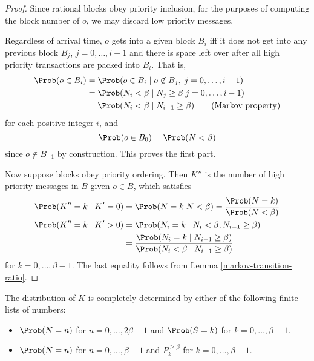 \documentclass[a4paper,11pt]{article}
\begin{document}
\begin{proof}

  Since rational blocks obey priority inclusion, for the purposes of computing the block number of $o$, we may discard low priority messages.
  
  Regardless of arrival time, $o$ gets into a given block $B_i$ iff it does not get into any previous block $B_j$, $j=0,\ldots,i-1$ and there is space left over after all high priority transactions are packed into $B_i$. 
  That is,
  \begin{align*}
    \Prob(o\in B_i) &= \Prob(o\in B_i\mid o\not\in B_{j},\;j=0,\ldots,i-1) \\
    &= \Prob(N_i < \beta \mid N_j\geq\beta\;j=0,\ldots,i-1) \\
    &= \Prob(N_i < \beta \mid N_{i-1}\geq\beta) \qquad \text{(Markov property)}
  \end{align*}
  for each positive integer $i$, and
  \[
    \Prob(o\in B_0) = \Prob(N<\beta)
  \]
  since $o\not\in B_{-1}$ by construction.
  This proves the first part.
  
  Now suppose blocks obey priority ordering. 
  Then $K''$ is the number of high priority messages in $B$ given $o\in B$, which satisfies
  \begin{align*}
    \Prob(K''=k\mid K'=0) &= \Prob(N=k|N < \beta) = \frac{\Prob(N=k)}{\Prob(N<\beta)}  \\
    \Prob(K''=k\mid K'>0) &= \Prob(N_{i}=k\mid N_{i}<\beta, N_{i-1}\geq\beta) \\
    &= \frac{\Prob(N_{i}=k\mid  N_{i-1}\geq\beta)}
    {\Prob(N_{i}<\beta \mid N_{i-1}\geq\beta)}
  \end{align*}
  for $k=0,\ldots,\beta-1$.
  The last equality follows from Lemma \ref{markov-transition-ratio}.
  \qedhere

\end{proof}

\begin{corollary}
\label{message-number-finiteness}

  The distribution of $K$ is completely determined by either of the following finite lists of numbers:
  \begin{itemize}
    \item $\Prob(N = n)$ for $n=0,\ldots,2\beta-1$ and $\Prob(S=k)$ for $k=0,\ldots,\beta-1$.
    \item $\Prob(N = n)$ for $n=0,\ldots,\beta-1$ and $P^{\geq\beta}_k$ for $k=0,\ldots,\beta-1$.
  \end{itemize}
  
\end{corollary}
\end{document}

